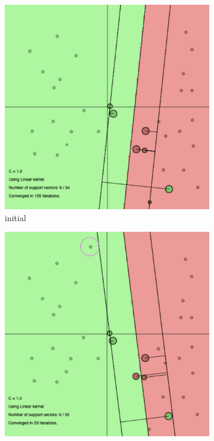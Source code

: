 \documentclass[a4paper, 11pt, one column]{article}
\begin{document}
\begin{figure}[]

        \begin{subfigure}{0.33\linewidth}
            \includegraphics[width=\linewidth]{images/lin_initial.png}
            \caption{initial}
        \end{subfigure}
        \begin{subfigure}{0.33\linewidth}
            \includegraphics[width=\linewidth]{images/lin_right_green.png}

\end{subfigure}
\end{figure}
\end{document}
